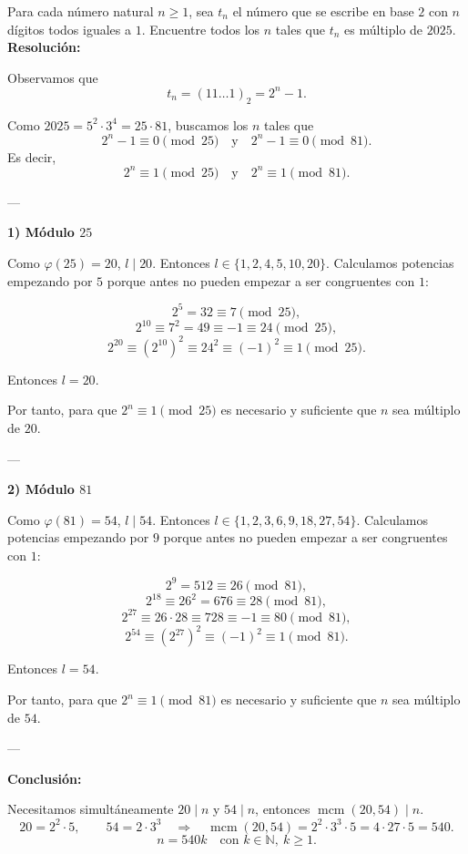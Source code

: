 \documentclass[a4paper,12pt]{article}
\begin{document}
\begin{ejercicio}[title=Ejercicio 31]
Para cada número natural $n\ge 1$, sea $t_n$ el número que se escribe en base $2$ con $n$ dígitos todos iguales a $1$.  
Encuentre todos los $n$ tales que $t_n$ es múltiplo de $2025$.
\tcblower
\textbf{Resolución:}

Observamos que
\[
t_n = (11\ldots1)_2 = 2^n - 1.
\]

Como $2025 = 5^2 \cdot 3^4 = 25 \cdot 81$, buscamos los $n$ tales que
\[
2^n - 1 \equiv 0 \pmod{25}\quad\text{y}\quad 2^n - 1 \equiv 0 \pmod{81}.
\]
Es decir,
\[
2^n \equiv 1 \pmod{25}\quad\text{y}\quad 2^n \equiv 1 \pmod{81}.
\]

---

\textbf{1) Módulo $25$}

Como $\varphi(25)=20$, $l \mid 20$. Entonces $l \in \{1,2,4,5,10,20\}$.  
Calculamos potencias empezando por $5$ porque antes no pueden empezar a ser congruentes con $1$:

\[
2^5 = 32 \equiv 7 \pmod{25},
\]
\[
2^{10} \equiv 7^2 = 49 \equiv -1 \equiv 24 \pmod{25},
\]
\[
2^{20} \equiv (2^{10})^2 \equiv 24^2 \equiv (-1)^2 \equiv 1 \pmod{25}.
\]

Entonces $l = 20$.

Por tanto, para que $2^n\equiv 1\pmod{25}$ es necesario y suficiente que $n$ sea múltiplo de $20$.

---

\textbf{2) Módulo $81$}

Como $\varphi(81)=54$, $l \mid 54$. Entonces $l \in \{1,2,3,6,9,18,27,54\}$.  
Calculamos potencias empezando por $9$ porque antes no pueden empezar a ser congruentes con $1$:

\[
2^9 = 512 \equiv 26 \pmod{81},
\]
\[
2^{18} \equiv 26^2 = 676 \equiv 28 \pmod{81},
\]
\[
2^{27} \equiv 26 \cdot 28 \equiv 728 \equiv -1 \equiv 80 \pmod{81},
\]
\[
2^{54} \equiv (2^{27})^2 \equiv (-1)^2 \equiv 1 \pmod{81}.
\]

Entonces $l = 54$.

Por tanto, para que $2^n\equiv 1\pmod{81}$ es necesario y suficiente que $n$ sea múltiplo de $54$.

---

\textbf{Conclusión:}

Necesitamos simultáneamente $20\mid n$ y $54\mid n$, entonces $\operatorname{mcm}(20,54)\mid n$.
\[
20 = 2^2\cdot 5,\qquad 54 = 2\cdot 3^3 \quad\Rightarrow\quad \operatorname{mcm}(20,54)=2^2\cdot 3^3\cdot 5 = 4\cdot 27\cdot 5 = 540.
\]
\[
\boxed{\,n=540k\quad\text{con }k\in\mathbb{N},\ k\ge 1.\,}
\]
\end{ejercicio}
\end{document}
